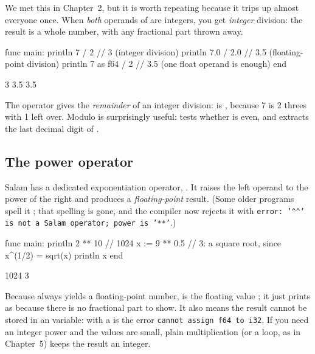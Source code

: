 We met this in Chapter~2, but it is worth repeating because it trips up almost
everyone once. When \emph{both} operands of \code{/} are integers, you get
\emph{integer} division: the result is a whole number, with any fractional part
thrown away.

\begin{salamen}
func main:
    println 7 / 2          // 3  (integer division)
    println 7.0 / 2.0      // 3.5 (floating-point division)
    println 7 as f64 / 2   // 3.5 (one float operand is enough)
end
\end{salamen}

\begin{progout}
3
3.5
3.5
\end{progout}

The \code{\%} operator gives the \emph{remainder} of an integer division:
 is , because 7 is 2 threes with 1 left over. Modulo is
surprisingly useful:  tests whether  is even, and
 extracts the last decimal digit of .

\subsection{The power operator}

Salam has a dedicated exponentiation operator, \code{**}. It raises the left
operand to the power of the right and produces a \emph{floating-point} result.
(Some older programs spell it \code{\textasciicircum\textasciicircum}; that
spelling is gone, and the compiler now rejects it with
\texttt{error: '\textasciicircum\textasciicircum' is not a Salam operator; power is '**'}.)

\begin{salamen}
func main:
    println 2 ** 10        // 1024
    x := 9 ** 0.5          // 3: a square root, since x^(1/2) = sqrt(x)
    println x
end
\end{salamen}

\begin{progout}
1024
3
\end{progout}

\begin{note}
Because \code{**} always yields a floating-point number,  is the
floating value ; it just prints as  because there is no
fractional part to show. It also means the result cannot be stored in an
 variable:  with a  is the error
\texttt{cannot assign \textquotesingle{}f64\textquotesingle{} to \textquotesingle{}i32\textquotesingle{}}. If you need an integer power and the
values are small, plain multiplication (or a loop, as in Chapter~5) keeps the
result an integer.
\end{note}

